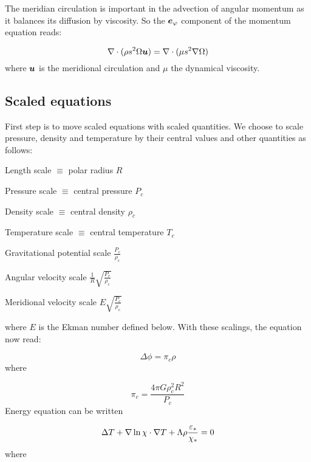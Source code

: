 The meridian circulation is important in the advection of angular
momentum as it balances its diffusion by viscosity. So the $\ephi$
component of the momentum equation reads:

\begin{equation}
\label{eq:angular_mom}
\na\cdot{(\rho s^2\Omega\vu)}=\na\cdot (\mu s^2\na\Omega)
\end{equation}
where $\vu$ is the meridional circulation and $\mu$ the dynamical
viscosity.


\subsection{Scaled equations}

First step is to move scaled equations with scaled quantities. We choose
to scale pressure, density and temperature by their central values and
other quantities as follows:

\begin{center}\parbox{10cm}{

Length scale $\equiv$ polar radius \dotfill $R$

Pressure scale $\equiv$ central pressure \dotfill $P_c$

Density scale $\equiv$ central density \dotfill $\rho_c$

Temperature scale $\equiv$ central temperature \dotfill $T_c$

Gravitational potential scale \dotfill  $\frac{P_c}{\rho_c}$

Angular velocity scale \dotfill $\frac{1}{R}\sqrt{\frac{P_c}{\rho_c}}$

Meridional velocity scale \dotfill $E\sqrt{\frac{P_c}{\rho_c}}$
}
\end{center}\bigskip

where $E$ is the Ekman number defined below.
With these scalings, the equation now read:

\begin{equation} \Delta\phi = \pi_c \rho\end{equation}
where

\begin{equation} \pi_c = \frac{4\pi G\rho_c^2 R^2}{P_c}\label{picdef}\end{equation}
Energy equation can be written

\begin{equation} \Delta T + \nabla\ln\chi\cdot\nabla T +
\Lambda\rho\frac{\varepsilon_*}{\chi_*} = 0\end{equation}
where

